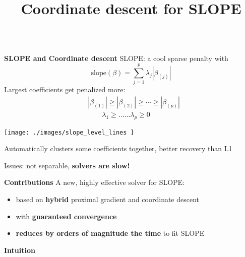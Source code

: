 \documentclass[english,final,t]{beamer}
\title{
	Coordinate descent for SLOPE}
\author{%
\texorpdfstring{
	\begin{minipage}{.98\linewidth}
	\begin{columns}%
		\column{.44\linewidth}
		\centering
		\Large Johan Larsson \\
		\large Lund University, Sweden \\[2em]
		\Large Mathurin Massias \\
		\large Univ. Lyon, Inria, CNRS, ENS de Lyon
		\column{.44\linewidth}
		\centering
		\Large Quentin Klopfenstein \\
		\large Université du Luxembourg \\[2em]
		\centering
		\Large Jonas Wallin \\
		\large Lund University, Sweden
	\end{columns}
	\vspace{1em}
\end{minipage}}{}
}
\begin{document}
\begin{frame}{}
\begin{columns}[t]
\begin{column}{.3\linewidth}
	\begin{block}{\textbf{\color{malgared} SLOPE and Coordinate descent}}
		\justifying
		SLOPE: a cool sparse penalty with \textbf{\color{malgared}{built-in coefficients clustering}}
		\begin{equation*}
			\mathrm{slope}(\beta) = \sum_{j=1}^p \lambda_j|\beta_{(j)}|
		\end{equation*}
		\vspace{.2em}
		Largest coefficients get penalized more:
		\vspace{.2em}
		\begin{align*}
		&|\beta_{(1)}| \geq |\beta_{(2)}| \geq \cdots \geq |\beta_{(p)}|  \\[5mm]
		& \quad \quad \lambda_1 \geq \ldots \ldots \lambda_p \geq 0
		\end{align*}

		\vspace{.3em}

		\begin{center}
		\texttt{[image: ./images/slope\_level\_lines
		]}
		\end{center}

		Automatically clusters some coefficients together, better recovery than L1
		\vspace{.4em}

		Issues: not separable, \textbf{\textcolor{malgared}{solvers are slow!}}

	\end{block}
	\begin{block}{\textbf{\color{malgared} Contributions}}
			A new, highly effective solver for SLOPE:
			\vspace{1em}
			\begin{itemize}
				\item  based on \textbf{\color{malgared}hybrid} proximal gradient and coordinate descent
				\item  with \textbf{\color{malgared}guaranteed convergence}
				\item  \textbf{\color{malgared}reduces by orders of magnitude the time}
				 to fit SLOPE
			\end{itemize}
	\end{block}

	\begin{block}{\textbf{\color{malgared} Intuition}}


\end{block}
\end{column}
\end{columns}
\end{frame}
\end{document}
